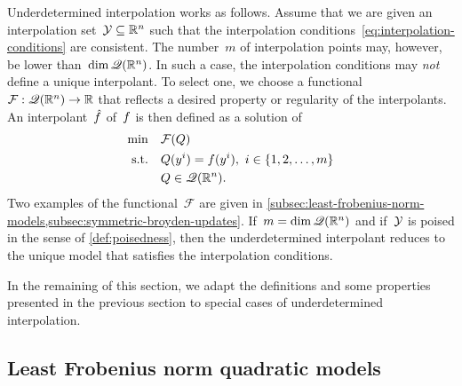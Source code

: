 Underdetermined interpolation works as follows.
Assume that we are given an interpolation set~$\xpt \subseteq \R^n$ such that the interpolation conditions~\cref{eq:interpolation-conditions} are consistent.
The number~$m$ of interpolation points may, however, be lower than~$\dim \mathscr{Q}(\mathbb{R}^n)$.
In such a case, the interpolation conditions may \emph{not} define a unique interpolant.
To select one, we choose a functional~$\mathcal{F} : \mathscr{Q}(\mathbb{R}^n) \to \mathbb{R}$ that reflects a desired property or regularity of the interpolants.
An interpolant~$\objm$ of~$f$ is then defined as a solution of
\begin{subequations}
    \label{eq:underdetermined-models}
    \begin{align}
        \min        & \quad \mathcal{F}(Q)\\
        \text{s.t.} & \quad Q(y^i) = f(y^i), ~ i \in \{1, 2, \dots, m\}\\
                    & \quad Q \in \mathscr{Q}(\mathbb{R}^n). \nonumber
    \end{align}
\end{subequations}
Two examples of the functional~$\mathcal{F}$ are given in \cref{subsec:least-frobenius-norm-models,subsec:symmetric-broyden-updates}.
If~$m = \dim \mathscr{Q}(\mathbb{R}^n)$ and if~$\xpt$ is poised in the sense of \cref{def:poisedness}, then the underdetermined interpolant reduces to the unique model that satisfies the interpolation conditions.

In the remaining of this section, we adapt the definitions and some properties presented in the previous section to special cases of underdetermined interpolation.

\subsection{Least Frobenius norm quadratic models}
\label{subsec:least-frobenius-norm-models}

